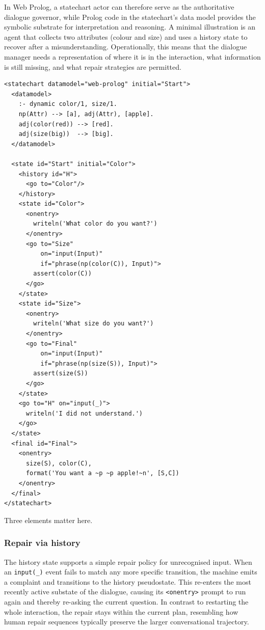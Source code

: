 In Web Prolog, a statechart actor can therefore serve as the authoritative dialogue governor, while Prolog code in the statechart's data model provides the symbolic substrate for interpretation and reasoning. A minimal illustration is an agent that collects two attributes (colour and size) and uses a history state to recover after a misunderstanding. Operationally, this means that the dialogue manager needs a representation of where it is in the interaction, what information is still missing, and what repair strategies are permitted.

\begin{verbatim}
<statechart datamodel="web-prolog" initial="Start">
  <datamodel>
    :- dynamic color/1, size/1.
    np(Attr) --> [a], adj(Attr), [apple].
    adj(color(red)) --> [red].
    adj(size(big))  --> [big].
  </datamodel>

  <state id="Start" initial="Color">
    <history id="H">
      <go to="Color"/>
    </history>
    <state id="Color">
      <onentry>
        writeln('What color do you want?')
      </onentry>
      <go to="Size" 
          on="input(Input)" 
          if="phrase(np(color(C)), Input)">
        assert(color(C))
      </go>
    </state>
    <state id="Size">
      <onentry>
        writeln('What size do you want?')
      </onentry>
      <go to="Final" 
          on="input(Input)" 
          if="phrase(np(size(S)), Input)">
        assert(size(S))
      </go>
    </state>
    <go to="H" on="input(_)">
      writeln('I did not understand.')
    </go>
  </state>
  <final id="Final">
    <onentry>
      size(S), color(C),
      format('You want a ~p ~p apple!~n', [S,C])
    </onentry>
  </final>
</statechart>
\end{verbatim}

\noindent Three elements matter here.

\subsubsection{Repair via history}

The history state supports a simple repair policy for unrecognised input. When an \texttt{input(\_)} event fails to match any more specific transition, the machine emits a complaint and transitions to the history pseudostate. This re-enters the most recently active substate of the dialogue, causing its \texttt{<onentry>} prompt to run again and thereby re-asking the current question. In contrast to restarting the whole interaction, the repair stays within the current plan, resembling how human repair sequences typically preserve the larger conversational trajectory.

